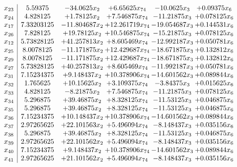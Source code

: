 \documentclass[11pt]{article}
\begin{document}
\[\begin{array}{c| c c@{\hskip 2pt} c@{\hskip 2pt} c@{\hskip 2pt} c@{\hskip 2pt} }
 x_{23}   &  5.59375 & -34.0625 x_{2} & + 6.65625 x_{74} & -10.0625 x_{3} & + 0.09375 x_{6}\\
 x_{24}   &  4.828125 & + 1.78125 x_{2} & + 7.546875 x_{74} & -11.21875 x_{3} & + 0.078125 x_{6}\\
 x_{17}   &  7.33203125 & -11.804687 x_{2} & + 12.261719 x_{74} & -19.054687 x_{3} & + 0.144531 x_{6}\\
 x_{26}   &  7.828125 & + 19.78125 x_{2} & + 10.546875 x_{74} & -15.21875 x_{3} & + 0.078125 x_{6}\\
 x_{12}   &  5.73828125 & + 41.257813 x_{2} & + 8.605469 x_{74} & -12.992187 x_{3} & + 0.050781 x_{6}\\
 x_{25}   &  8.0078125 & -11.171875 x_{2} & + 12.429687 x_{74} & -18.671875 x_{3} & + 0.132812 x_{6}\\
 x_{29}   &  8.0078125 & -11.171875 x_{2} & + 12.429687 x_{74} & -18.671875 x_{3} & + 0.132812 x_{6}\\
 x_{27}   &  5.73828125 & + 40.257813 x_{2} & + 8.605469 x_{74} & -11.992187 x_{3} & + 0.050781 x_{6}\\
 x_{31}   &  7.15234375 & + 9.148437 x_{2} & + 10.378906 x_{74} & -14.601562 x_{3} & + 0.089844 x_{6}\\
 x_{32}   &  1.765625 & + 10.15625 x_{2} & + 3.109375 x_{74} & -3.84375 x_{3} & + 0.015625 x_{6}\\
 x_{33}   &  4.828125 & -8.21875 x_{2} & + 7.546875 x_{74} & -11.21875 x_{3} & + 0.078125 x_{6}\\
 x_{34}   &  5.296875 & + 39.46875 x_{2} & + 8.328125 x_{74} & -11.53125 x_{3} & + 0.046875 x_{6}\\
 x_{35}   &  5.296875 & + 39.46875 x_{2} & + 8.328125 x_{74} & -11.53125 x_{3} & + 0.046875 x_{6}\\
 x_{36}   &  7.15234375 & + 10.148437 x_{2} & + 10.378906 x_{74} & -14.601562 x_{3} & + 0.089844 x_{6}\\
 x_{37}   &  2.97265625 & + 22.101563 x_{2} & + 5.496094 x_{74} & -8.148437 x_{3} & + 0.035156 x_{6}\\
 x_{38}   &  5.296875 & + 39.46875 x_{2} & + 8.328125 x_{74} & -11.53125 x_{3} & + 0.046875 x_{6}\\
 x_{39}   &  2.97265625 & + 22.101562 x_{2} & + 5.496094 x_{74} & -8.148437 x_{3} & + 0.035156 x_{6}\\
 x_{40}   &  7.15234375 & + 9.148437 x_{2} & + 10.378906 x_{74} & -14.601562 x_{3} & + 0.089844 x_{6}\\
 x_{41}   &  2.97265625 & + 21.101562 x_{2} & + 5.496094 x_{74} & -8.148437 x_{3} & + 0.035156 x_{6}\\

\end{array}\]
\end{document}

